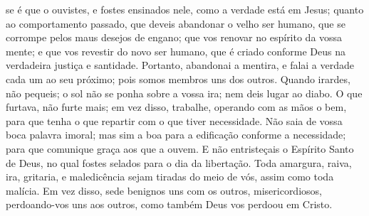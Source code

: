 {  se é que o ouvistes, e fostes ensinados nele, como a verdade está em Jesus;
  quanto ao comportamento passado, que deveis abandonar o velho ser humano, que se corrompe pelos maus desejos de engano;
  que
{} vos renovar no espírito da vossa mente;
  e que
{} vos revestir do novo ser humano, que é criado conforme Deus na verdadeira justiça e santidade.
  Portanto, abandonai a mentira, e falai a verdade cada um ao seu próximo; pois somos membros uns dos outros.
  Quando irardes, não pequeis;
 o sol não se ponha sobre a vossa ira;
  nem deis lugar ao diabo.
  O que furtava, não furte mais; em vez disso, trabalhe, operando com as mãos o bem, para que tenha o que repartir com o que tiver necessidade.
  Não saia de vossa boca palavra imoral; mas sim a boa para a edificação conforme a necessidade; para que comunique graça aos que a ouvem.
  E não entristeçais o Espírito Santo de Deus, no qual fostes selados para o dia da libertação.
  Toda amargura, raiva, ira, gritaria, e maledicência sejam tiradas do meio de vós, assim como toda malícia.
  Em vez disso, sede benignos uns com os outros, misericordiosos, perdoando-vos uns aos outros, como também Deus vos perdoou em Cristo.
\par }

